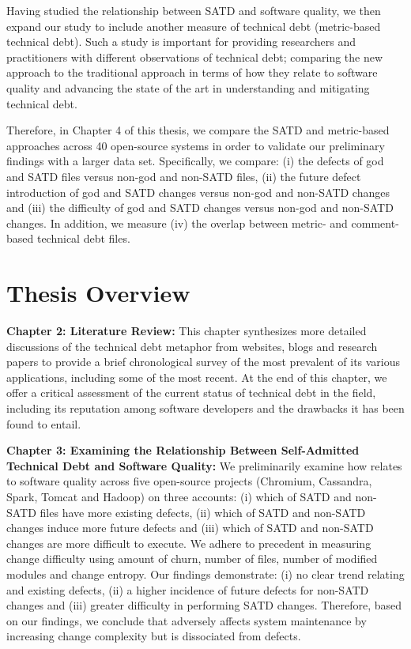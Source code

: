 Having studied the relationship between SATD and software quality, we then expand our study to include another measure of technical debt (metric-based technical debt). Such a study is important for providing researchers and practitioners with different observations of technical debt; comparing the new approach to the traditional approach in terms of how they relate to software quality and advancing the state of the art in understanding and mitigating technical debt.\par



Therefore, in Chapter 4 of this thesis, we compare the SATD and metric-based approaches across 40 open-source systems in order to validate our preliminary findings with a larger data set. Specifically, we compare: (i) the defects of god and SATD files versus non-god and non-SATD files, (ii) the future defect introduction of god and SATD changes versus non-god and non-SATD changes and (iii) the difficulty of god and SATD changes versus non-god and non-SATD changes. In addition, we measure (iv) the overlap between metric- and comment-based technical debt files.

 
\section{Thesis Overview}

\textbf{Chapter 2: Literature Review:} This chapter synthesizes more detailed discussions of the technical debt metaphor from websites, blogs and research papers to provide a brief chronological survey of the most prevalent of its various applications, including some of the most recent.  At the end of this chapter, we offer a critical assessment of the current status of technical debt in the field, including its reputation among software developers and the drawbacks it has been found to entail.

\textbf{Chapter 3: Examining the Relationship Between Self-Admitted Technical Debt and Software Quality:} We preliminarily examine how \SATD relates to software quality across five open-source projects (Chromium, Cassandra, Spark, Tomcat and Hadoop) on three accounts: (i) which of SATD and non-SATD files have more existing defects, (ii) which of SATD and non-SATD changes induce more future defects and (iii) which of SATD and non-SATD changes are more difficult to execute. We adhere to precedent in measuring change difficulty using amount of churn, number of files, number of modified modules and change entropy. Our findings demonstrate: (i) no clear trend relating \SATD and existing defects, (ii) a higher incidence of future defects for non-SATD changes and (iii) greater difficulty in performing SATD changes. Therefore, based on our findings, we conclude that \SATD adversely affects system maintenance by increasing change complexity but is dissociated from defects.


